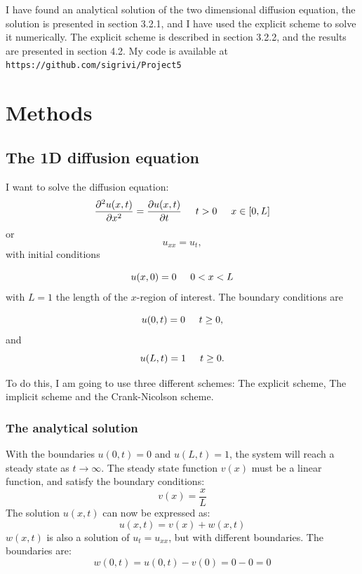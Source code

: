 \documentclass{article}
\begin{document}
I have found an analytical solution of the two dimensional diffusion equation, the solution is presented in section 3.2.1, and I have used the explicit scheme to solve it numerically. The explicit scheme is described in section 3.2.2, and the results are presented in section 4.2.
My code is available at \texttt{https://github.com/sigrivi/Project5}
\section{Methods}
\subsection{The 1D diffusion equation}
I want to solve the diffusion equation:
\begin{equation*}
 \frac{\partial^2 u(x,t)}{\partial x^2} =\frac{\partial u(x,t)}{\partial t}\hspace{0.5cm} t> 0 \hspace{0.5cm} x\in [0,L]
\end{equation*}
or
\begin{equation*}
u_{xx} = u_t,
\end{equation*}
with initial conditions

\begin{equation*}
u(x,0)= 0 \hspace{0.5cm} 0 < x < L
\end{equation*}
with $L=1$ the length of the $x$-region of interest. The 
boundary conditions are

\begin{equation*}
u(0,t)= 0 \hspace{0.5cm} t \ge 0,
\end{equation*}
and
\begin{equation*}
u(L,t)= 1 \hspace{0.5cm} t \ge 0.
\end{equation*}

To do this, I am going to use three different schemes: The explicit scheme, The implicit scheme and the Crank-Nicolson scheme. 
\subsubsection{The analytical solution}
With the boundaries $u(0,t) = 0$ and $u(L,t)= 1$, the system will reach a steady state as $t \rightarrow \infty $. The steady state function $v(x)$ must be a linear function, and satisfy the boundary conditions: 
\begin{equation*}
v(x) = \frac{x}{L}
\end{equation*}
The solution $u(x,t)$ can now be expressed as:
\begin{equation*}
u(x,t) = v(x) + w(x,t)
\end{equation*}
$w(x,t)$ is also a solution of $u_t = u_{xx}$, but with different boundaries. The boundaries are:
\begin{equation*}
w(0,t) = u(0,t)-v(0)= 0 - 0 = 0
\end{equation*}
\end{document}
